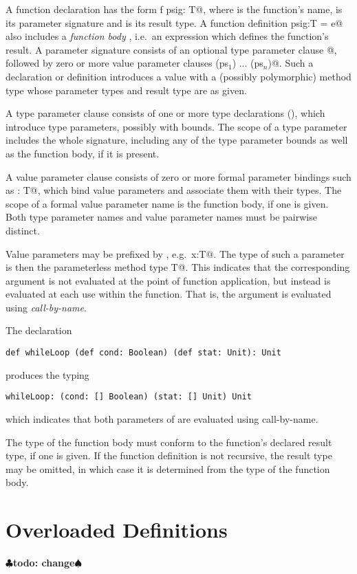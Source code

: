 \documentclass[11pt]{report}
\renewcommand{\todo}[1]{{$\clubsuit$\bf todo: #1$\spadesuit$}}
\begin{document}
A function declaration has the form \verb@def f psig: T@, where
\verb@f@ is the function's name, \verb@psig@ is its parameter
signature and \verb@T@ is its result type. A function definition
\verb@f psig:T = e@ also includes a {\em function body} \verb@e@,
i.e.\ an expression which defines the function's result.  A parameter
signature consists of an optional type parameter clause \verb@[tps]@,
followed by zero or more value parameter clauses
\verb@(ps$_1$) ... (ps$_n$)@.  Such a declaration or definition
introduces a value with a (possibly polymorphic) method type whose
parameter types and result type are as given.

A type parameter clause \verb@tps@ consists of one or more type
declarations (), which introduce type parameters,
possibly with bounds.  The scope of a type parameter includes
the whole signature, including any of the type parameter bounds as
well as the function body, if it is present.  

A value parameter clause \verb@ps@ consists of zero or more formal
parameter bindings such as \verb@x: T@, which bind value
parameters and associate them with their types.  The scope of a formal
value parameter name \verb@x@ is the function body, if one is
given. Both type parameter names and value parameter names must be
pairwise distinct.

Value parameters may be prefixed by \verb@def@, e.g.\
\verb@def x:T@. The type of such a parameter is then the
parameterless method type \verb@[]T@. This indicates that the
corresponding argument is not evaluated at the point of function
application, but instead is evaluated at each use within the
function. That is, the argument is evaluated using {\em call-by-name}.

\example The declaration
\begin{verbatim}
def whileLoop (def cond: Boolean) (def stat: Unit): Unit
\end{verbatim}
produces the typing
\begin{verbatim}
whileLoop: (cond: [] Boolean) (stat: [] Unit) Unit
\end{verbatim}
which indicates that both parameters of \verb@while@ are evaluated using
call-by-name.

The type of the function body must conform to the function's declared
result type, if one is given. If the function definition is not
recursive, the result type may be omitted, in which case it is
determined from the type of the function body.

\section{Overloaded Definitions}
\label{sec:overloaded-defs}
\todo{change}
\end{document}
